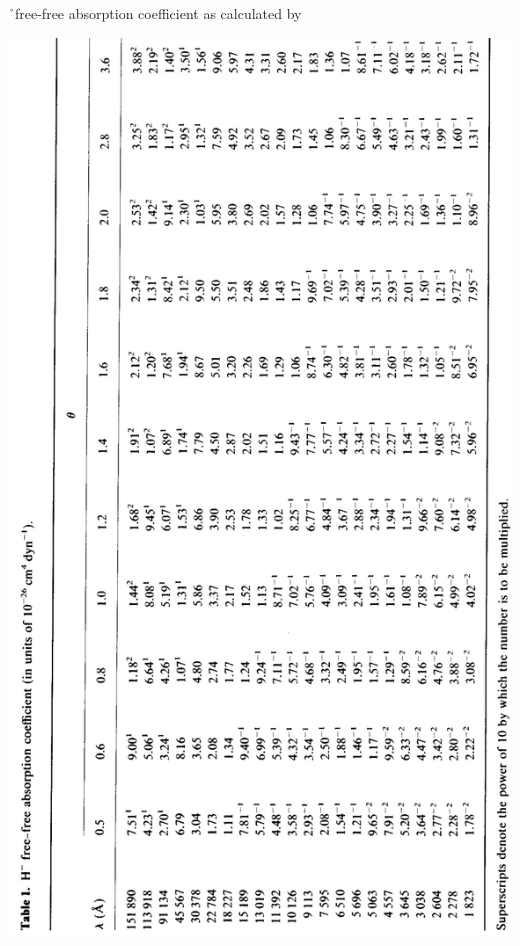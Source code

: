 \begin{table}
\caption{\label{tab:freefreetable}\h\ free-free absorption coefficient as calculated by \cite{bell1987}}
\includegraphics[width=\linewidth]{figs/freefreetable.png}
\end{table}

